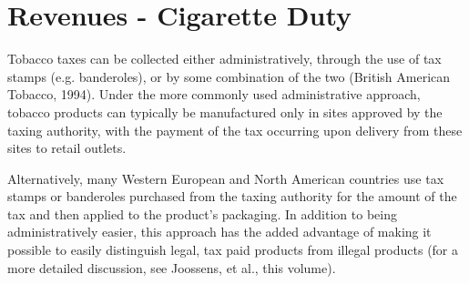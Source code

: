 \chapter{Revenues - Cigarette Duty} 
Tobacco taxes can be collected either administratively, through the use of tax stamps (e.g.
banderoles), or by some combination of the two (British American Tobacco, 1994).  Under the
more commonly used administrative approach, tobacco products can typically be manufactured
only in sites approved by the taxing authority, with the payment of the tax occurring upon
delivery from these sites to retail outlets.  



Alternatively, many Western European and North
American countries use tax stamps or banderoles purchased from the taxing authority for the
amount of the tax and then applied to the product's packaging.  In addition to being
administratively easier, this approach has the added advantage of making it possible to easily
distinguish legal, tax paid products from illegal products (for a more detailed discussion, see
Joossens, et al., this volume).  

